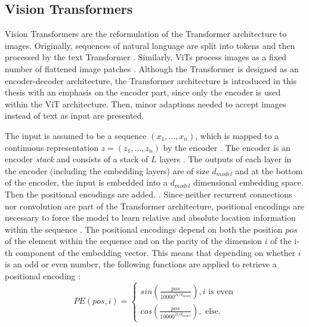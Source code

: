 \subsection{Vision Transformers}
\label{section: Vision Transformers}
Vision Transformers are the reformulation of the Transformer architecture \cite{Vaswani2017} to images.
Originally, sequences of natural language are split into tokens and then processed by the text Transformer \citep{Vaswani2017}.  
Similarly, ViTs process images as a fixed number of flattened image patches \citep{Dosovitskiy2020}.
Although the Transformer is designed as an encoder-decoder architecture, the Transformer architecture is introduced in this thesis with an emphasis on the encoder part, since only the encoder is used within the ViT architecture.
Then, minor adaptions needed to accept images instead of text as input are presented.
\par
The input is assumed to be a sequence $(x_1,\dots,x_n)$, which is mapped to a continuous representation $z=(z_1,\dots,z_n)$ by the encoder \citep{Vaswani2017}.
The encoder is an encoder \textit{stack} and consists of a stack of $L$ layers \citep{Vaswani2017}.
The outputs of each layer in the encoder (including the embedding layers) are of size $d_{model}$ and at the bottom of the encoder, the input is embedded into a $d_{model}$ dimensional embedding space.
Then the positional encodings are added. \citep{Vaswani2017}.
Since neither recurrent connections nor convolution are part of the Transformer architecture, positional encodings are necessary to force the model to learn relative and absolute location information within the sequence \citep{Vaswani2017}.
The positional encodings depend on both the position $pos$ of the element within the sequence and on the parity of the dimension $i$ of the i-th component of the embedding vector.
This means that depending on whether $i$ is an odd or even number, the following functions are applied to retrieve a positional encoding \citep{Vaswani2017}:
\begin{equation}
	PE(pos, i) = 
	\begin{cases}
		sin(\frac{pos}{10000^{2i / d_{model}}}), i \text{ is even} \\
		cos(\frac{pos}{10000^{2i / d_{model}}}), \text{ else}.
	\end{cases}
	\label{equation:positional-encoding}
\end{equation}
